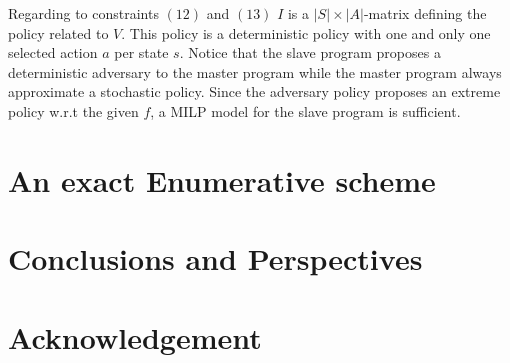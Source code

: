 \documentclass[runningheads,a4paper]{llncs}
\begin{document}
Regarding to constraints $(12)$ and $(13)$ $I$ is a $|S|\times|A|$-matrix defining the policy related to $V$. This policy is a deterministic policy with one and only one selected action $a$ per state $s$. Notice that the slave program proposes a deterministic adversary to the master program while the master program always approximate a stochastic policy. Since the adversary policy proposes an extreme policy w.r.t the given $f$, a MILP model for the slave program is sufficient.   

\section{An exact Enumerative scheme} 
 
\section{Conclusions and Perspectives}
		

\section*{Acknowledgement}



\end{document}
